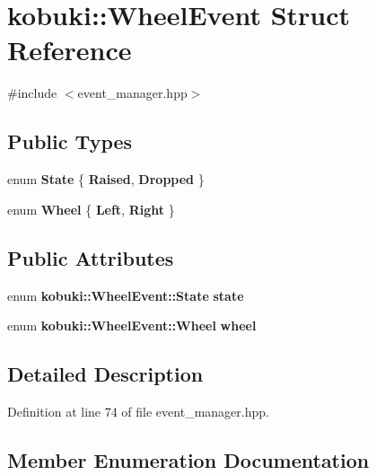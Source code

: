 \section{kobuki\-:\-:\-Wheel\-Event \-Struct \-Reference}
\label{structkobuki_1_1WheelEvent}


{\ttfamily \#include $<$event\-\_\-manager.\-hpp$>$}

\subsection*{\-Public \-Types}
\begin{DoxyCompactItemize}
\item 
enum {\bf \-State} \{ {\bf \-Raised}, 
{\bf \-Dropped}
 \}
\item 
enum {\bf \-Wheel} \{ {\bf \-Left}, 
{\bf \-Right}
 \}
\end{DoxyCompactItemize}
\subsection*{\-Public \-Attributes}
\begin{DoxyCompactItemize}
\item 
enum {\bf kobuki\-::\-Wheel\-Event\-::\-State} {\bf state}
\item 
enum {\bf kobuki\-::\-Wheel\-Event\-::\-Wheel} {\bf wheel}
\end{DoxyCompactItemize}


\subsection{\-Detailed \-Description}


\-Definition at line 74 of file event\-\_\-manager.\-hpp.



\subsection{\-Member \-Enumeration \-Documentation}
